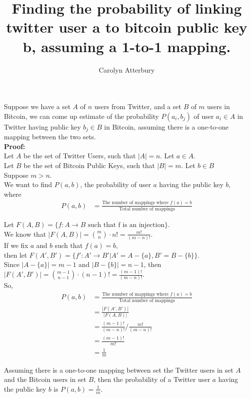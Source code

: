 \documentclass{article}
\title{Finding the probability of linking twitter user a to bitcoin public key
  b, assuming a 1-to-1 mapping.}
\author{Carolyn Atterbury}
\begin{document}
\maketitle

Suppose we have a set $A$ of $n$ users from Twitter, and a set $B$ of $m$ users
in Bitcoin, we can come up estimate of the probability $P(a_i, b_j)$ of user $a_i \in A$ in
Twitter having public key $b_j \in B$ in Bitcoin, assuming there is a one-to-one
mapping between the two sets. \\

\textbf{Proof:}\\


Let $A$ be the set of Twitter Users, such that $|A| = n$. Let $a \in A$.\\

Let $B$ be the set of Bitcoin Public Keys, such that $|B| = m$. Let $b \in B$\\
Suppose $m>n$.\\

We want to find $P(a,b)$, the probability of user $a$ having the public key $b$,
where
\begin{align*}
  P(a,b) &= \frac{\text{The number of mappings where $f(a) = b$}}{\text{Total number of mappings}}
\end{align*}

Let $F(A, B) = \{ f: A\rightarrow B \text{ such that f is an injection}\}$. \\

We know that $|F(A,B)| = {m\choose n}\cdot n! = \frac{m!}{(m-n)!} $.\\

If we fix $a$ and $b$ such that $f(a)=b$,\\

then let $F(A', B') = \{f': A' \rightarrow B' | A' = A - \{ a\}, B' = B - \{ b\}\}$. \\

Since $|A-\{a\}| = m - 1$ and $|B-\{b\}| = n - 1$, then $|F(A', B')| =
{m-1\choose n-1}\cdot (n-1)! = \frac{(m-1)!}{(m-n)!}$.\\
 


 So,
 \begin{align*}
   P(a,b) &= \frac{\text{The number of mappings where $f(a) = b$}}{\text{Total number of mappings}}\\
          &= \frac{|F(A', B')|}{|F(A,B)|}\\
          &= \frac{(m-1)!}{(m-n)!}/\frac{m!}{(m-n)!}\\
          &= \frac{(m-1)!}{m!}\\
            &= \frac{1}{m}
  \end{align*}

  Assuming there is a one-to-one mapping between set the Twitter users in set
  $A$ and the Bitcoin users in set $B$, then the probability of a Twitter user
  $a$ having the public key $b$ is $P(a,b) = \frac{1}{m}$.


 
\end{document}
